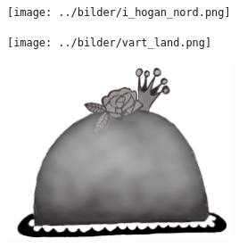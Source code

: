 %

\begin{intersong}
\sffamily\bfseries\LARGE{}
\begin{center}
\texttt{[image: ../bilder/i\_hogan\_nord.png]} 
\end{center}
\end{intersong}
\sclearpage

\begin{intersong}
\begin{center}
\texttt{[image: ../bilder/vart\_land.png]} 
\end{center}
\end{intersong}
\sclearpage

\sclearpage

\sclearpage

\sclearpage

\sclearpage

\sclearpage

\sclearpage

\sclearpage

\sclearpage

\sclearpage

\sclearpage

\sclearpage

\sclearpage

\begin{intersong}
	\vspace{10mm}
\begin{center}
\includegraphics[width=0.5\textwidth]{../bilder/fardigabilder/CamillasFardigaBilder/Sverigesnationalsangprincesstarta.png} 
\end{center}
\end{intersong}
\sclearpage

\sclearpage

\sclearpage
